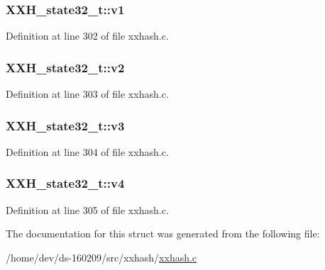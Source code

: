 \hypertarget{struct_x_x_h__state32__t_a52d93caf96ab3cfa4d19faa232627402}{}
\subsubsection[{v1}]{ X\+X\+H\+\_\+state32\+\_\+t\+::v1}\label{struct_x_x_h__state32__t_a52d93caf96ab3cfa4d19faa232627402}


Definition at line 302 of file xxhash.\+c.

\hypertarget{struct_x_x_h__state32__t_a77ca5f7d04bf820d40c0b849e69c932b}{}
\subsubsection[{v2}]{ X\+X\+H\+\_\+state32\+\_\+t\+::v2}\label{struct_x_x_h__state32__t_a77ca5f7d04bf820d40c0b849e69c932b}


Definition at line 303 of file xxhash.\+c.

\hypertarget{struct_x_x_h__state32__t_a766430cd39ae981afd8a64d10329ec3d}{}
\subsubsection[{v3}]{ X\+X\+H\+\_\+state32\+\_\+t\+::v3}\label{struct_x_x_h__state32__t_a766430cd39ae981afd8a64d10329ec3d}


Definition at line 304 of file xxhash.\+c.

\hypertarget{struct_x_x_h__state32__t_a33ede79f26b162219c1475e39766148d}{}
\subsubsection[{v4}]{ X\+X\+H\+\_\+state32\+\_\+t\+::v4}\label{struct_x_x_h__state32__t_a33ede79f26b162219c1475e39766148d}


Definition at line 305 of file xxhash.\+c.



The documentation for this struct was generated from the following file\+:\begin{DoxyCompactItemize}
\item 
/home/dev/ds-\/160209/src/xxhash/\hyperlink{xxhash_8c}{xxhash.\+c}\end{DoxyCompactItemize}
